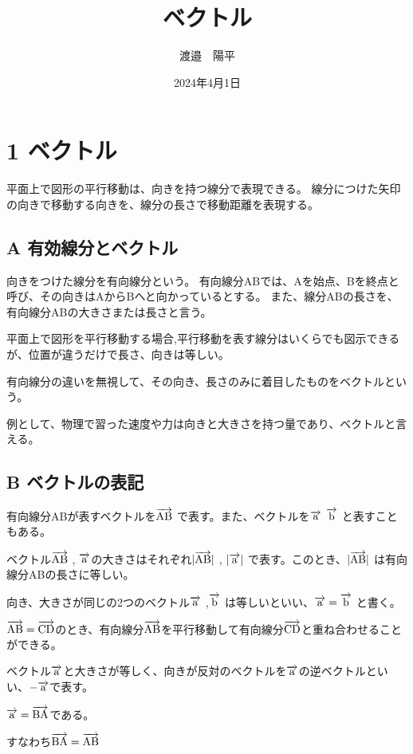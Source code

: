 \documentclass[pulatex,dvpdfmx,a4paper]{jsarticle}
\title{ベクトル}
\author{渡邉　陽平}
\date{2024年4月1日}
\newcommand{\abs}[1]{\lvert #1 \rvert}
\newcommand{\bekutoru}[1]{\overrightarrow{\rm #1}}
\begin{document}
\maketitle

\section*{1 ベクトル}

平面上で図形の平行移動は、向きを持つ線分で表現できる。
線分につけた矢印の向きで移動する向きを、線分の長さで移動距離を表現する。

\subsection*{A 有効線分とベクトル}

向きをつけた線分を有向線分という。
有向線分ABでは、Aを始点、Bを終点と呼び、その向きはAからBへと向かっているとする。
また、線分ABの長さを、有向線分ABの大きさまたは長さと言う。

平面上で図形を平行移動する場合,平行移動を表す線分はいくらでも図示できるが、位置が違うだけで長さ、向きは等しい。

有向線分の違いを無視して、その向き、長さのみに着目したものをベクトルという。

例として、物理で習った速度や力は向きと大きさを持つ量であり、ベクトルと言える。

\subsection*{B ベクトルの表記}
有向線分ABが表すベクトルを$\bekutoru{AB}$ で表す。また、ベクトルを$\bekutoru{a}$ $\bekutoru{b}$ と表すこともある。
\par ベクトル$\bekutoru{AB}$ , $\bekutoru{a}$の大きさはそれぞれ$\abs{\bekutoru{AB}}$ , $\abs{\bekutoru{a}}$ で表す。このとき、$\abs{\bekutoru{AB}}$ は有向線分ABの長さに等しい。
\par 向き、大きさが同じの2つのベクトル$\bekutoru{a}$ ,$\bekutoru{b}$ は等しいといい、$\bekutoru{a}=\bekutoru{b}$ と書く。
\par$\bekutoru{AB}=\bekutoru{CD}$のとき、有向線分$\bekutoru{AB}$を平行移動して有向線分$\bekutoru{CD}$と重ね合わせることができる。

\par
ベクトル$\bekutoru{a}$と大きさが等しく、向きが反対のベクトルを$\bekutoru{a}$の逆ベクトルといい、$-\bekutoru{a}$で表す。

\begin{screen}
  $\bekutoru{a}=\bekutoru{BA}$である。\par
  すなわち$\bekutoru{BA}=\bekutoru{AB}$
\end{screen}
\end{document}
